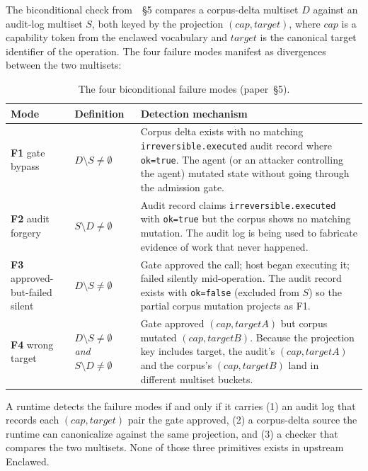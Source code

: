 \documentclass[11pt]{article}
\begin{document}
The biconditional check from~\cite{Metere2026enclawed}~§5 compares a
corpus-delta multiset $D$ against an audit-log multiset $S$, both
keyed by the projection $(\mathit{cap}, \mathit{target})$, where
$\mathit{cap}$ is a capability token from the enclawed vocabulary and
$\mathit{target}$ is the canonical target identifier of the
operation. The four failure modes manifest as divergences between the
two multisets:

\begin{table}[h]
\centering
\small
\begin{tabular}{|p{2.3cm}|p{4.0cm}|p{8.0cm}|}
\hline
\textbf{Mode} & \textbf{Definition} & \textbf{Detection mechanism} \\
\hline
\textbf{F1} gate bypass &
$D \setminus S \neq \emptyset$ &
Corpus delta exists with no matching \texttt{irreversible.executed} audit
record where \texttt{ok=true}. The agent (or an attacker controlling the
agent) mutated state without going through the admission gate. \\
\hline
\textbf{F2} audit forgery &
$S \setminus D \neq \emptyset$ &
Audit record claims \texttt{irreversible.executed} with \texttt{ok=true}
but the corpus shows no matching mutation. The audit log is being used to
fabricate evidence of work that never happened. \\
\hline
\textbf{F3} approved-but-failed silent &
$D \setminus S \neq \emptyset$ &
Gate approved the call; host began executing it; failed silently
mid-operation. The audit record exists with \texttt{ok=false} (excluded
from $S$) so the partial corpus mutation projects as F1. \\
\hline
\textbf{F4} wrong target &
$D \setminus S \neq \emptyset$ \emph{and} $S \setminus D \neq \emptyset$ &
Gate approved $(\mathit{cap}, \mathit{targetA})$ but corpus mutated
$(\mathit{cap}, \mathit{targetB})$. Because the projection key includes
target, the audit's $(\mathit{cap}, \mathit{targetA})$ and the corpus's
$(\mathit{cap}, \mathit{targetB})$ land in different multiset buckets. \\
\hline
\end{tabular}
\caption{The four biconditional failure modes (paper~§5).}
\label{tab:fmodes}
\end{table}

A runtime detects the failure modes if and only if it carries (1) an
audit log that records each $(\mathit{cap}, \mathit{target})$ pair the gate
approved, (2) a corpus-delta source the runtime can canonicalize against
the same projection, and (3) a checker that compares the two multisets.
None of those three primitives exists in upstream Enclawed.
\end{document}
